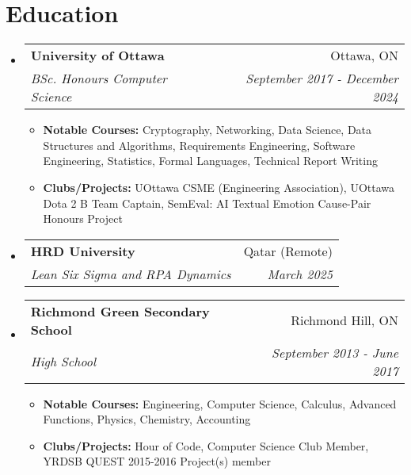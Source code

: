 \documentclass[letterpaper,11pt]{article}
\makeatletter
\newcommand{\resumeItem}[2]{
  \item\small{
    \textbf{#1}{#2 \vspace{-2pt}}
  }
}
\newcommand{\resumeSubheading}[4]{
  \vspace{-1pt}\item
    \begin{tabular*}{0.97\textwidth}[t]{l@{\extracolsep{\fill}}r}
      \textbf{#1} & #2 \\
      \textit{\small#3} & \textit{\small #4} \\
    \end{tabular*}\vspace{-5pt}
}
\newcommand{\resumeSubHeadingListStart}{\begin{itemize}[leftmargin=*]}
\newcommand{\resumeSubHeadingListEnd}{\end{itemize}}
\newcommand{\resumeItemListStart}{\begin{itemize}}
\newcommand{\resumeItemListEnd}{\end{itemize}\vspace{-5pt}}
\makeatother
\begin{document}
\section{Education}
\resumeSubHeadingListStart
  \resumeSubheading
    {University of Ottawa}{Ottawa, ON}
    {BSc. Honours Computer Science}{September 2017 - December 2024}
    \resumeItemListStart
      \resumeItem{Notable Courses: }{Cryptography, Networking, Data Science, Data Structures and Algorithms, Requirements Engineering, Software Engineering, Statistics, Formal Languages, Technical Report Writing}
      \resumeItem{Clubs/Projects: }{UOttawa CSME (Engineering Association), UOttawa Dota 2 B Team Captain, SemEval: AI Textual Emotion Cause-Pair Honours Project}
    \resumeItemListEnd
  \resumeSubheading
    {HRD University}{Qatar (Remote)}
    {Lean Six Sigma and RPA Dynamics}{March 2025}
  \resumeSubheading
    {Richmond Green Secondary School}{Richmond Hill, ON}
    {High School}{September 2013 - June 2017}
    \resumeItemListStart
      \resumeItem{Notable Courses: }{Engineering, Computer Science, Calculus, Advanced Functions, Physics, Chemistry, Accounting}
      \resumeItem{Clubs/Projects: }{Hour of Code, Computer Science Club Member, YRDSB QUEST 2015-2016 Project(s) member}
    \resumeItemListEnd
\resumeSubHeadingListEnd

\end{document}
